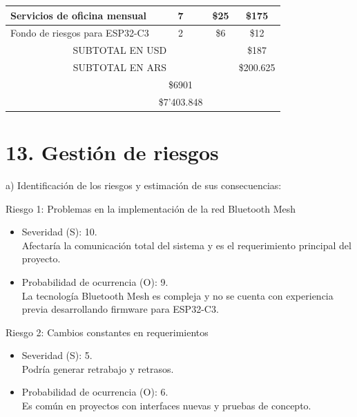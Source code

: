 \documentclass[
11pt, %
]{charter}
\begin{document}
\begin{table}[htpb]
\begin{tabularx}{\linewidth}{@{}|X|c|r|r|@{}}
  \multicolumn{1}{|l|}{Servicios de oficina mensual} & 
  \multicolumn{1}{c|}{7} &
  \multicolumn{1}{c|}{\$25} &
  \multicolumn{1}{c|}{\$175} \\ \hline
  
  \multicolumn{1}{|l|}{Fondo de riesgos para ESP32-C3} & 
  \multicolumn{1}{c|}{2} &
  \multicolumn{1}{c|}{\$6} &
  \multicolumn{1}{c|}{\$12} \\ \hline
    
  \multicolumn{3}{|c|}{SUBTOTAL EN USD} &
  \multicolumn{1}{c|}{\$187} \\ \hline
  
  \multicolumn{3}{|c|}{SUBTOTAL EN ARS} &
  \multicolumn{1}{c|}{\$200.625} \\ \hline
  
\rowcolor[HTML]{C0C0C0}
\multicolumn{3}{|c|}{TOTAL EN USD} &
\multicolumn{1}{c|}{\$6901} \\ \hline
  
\rowcolor[HTML]{C0C0C0}
\multicolumn{3}{|c|}{TOTAL EN ARS} &
\multicolumn{1}{c|}{\$7'403.848} \\ \hline

\end{tabularx}%
\end{table}




\section{13. Gestión de riesgos}
\label{sec:riesgos}

a) Identificación de los riesgos y estimación de sus consecuencias:

Riesgo 1: Problemas en la implementación de la red Bluetooth Mesh
\begin{itemize}
	\item Severidad (S): 10. \\
	Afectaría la comunicación total del sistema y es el requerimiento principal del proyecto.	
	\item Probabilidad de ocurrencia (O): 9. \\
	La tecnología Bluetooth Mesh es compleja y no se cuenta con experiencia previa desarrollando firmware para ESP32-C3. 
\end{itemize}   

Riesgo 2: Cambios constantes en requerimientos
\begin{itemize}
	\item Severidad (S): 5. \\
	Podría generar retrabajo y retrasos.	
	\item Probabilidad de ocurrencia (O): 6. \\
	Es común en proyectos con interfaces nuevas y pruebas de concepto.
\end{itemize}   
\end{document}
